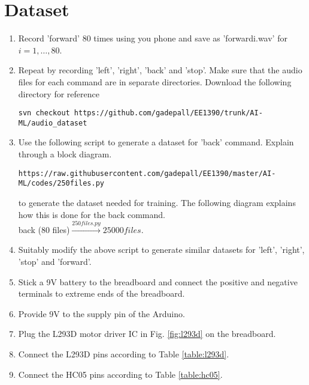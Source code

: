 \documentclass[journal,12pt,twocolumn]{IEEEtran}
\renewcommand\thesection{\arabic{section}}
\begin{document}
\section{Dataset}
%
\begin{enumerate}[label=\thesection.\arabic*
,ref=\thesection.\theenumi]

\item Record 'forward' 80 times using you phone and save as 'forwardi.wav' for $i 
= 1,\dots, 80$.
%
\item Repeat by recording 'left', 'right', 'back' and 'stop'. Make sure that the 
audio files for each command are in separate directories. Download the following 
directory for reference
\begin{lstlisting}
svn checkout https://github.com/gadepall/EE1390/trunk/AI-ML/audio_dataset
\end{lstlisting}
\item Use the following script to generate a dataset for 'back' command. Explain 
through a block diagram.
\begin{lstlisting}
https://raw.githubusercontent.com/gadepall/EE1390/master/AI-ML/codes/250files.py
\end{lstlisting}
%
\solution
to generate the dataset needed for training. The following diagram explains how this 
is done for the back command.
\\
back (80 files)$\overset{250files.py}{\rightarrow}25000 files$.
\item Suitably modify the above script to generate similar datasets for 'left', 'right', 'stop' and 'forward'. 
%
\item 
Stick a 9V battery to the breadboard and connect the positive and negative terminals to extreme ends of the breadboard.
%
\item
Provide 9V to the supply pin of the Arduino.
%
\item
Plug the L293D motor driver IC in Fig. \ref{fig:l293d} on the breadboard.

%
%
\item
Connect the L293D pins according to Table \ref{table:l293d}.

%	
\item
Connect the HC05 pins according to Table \ref{table:hc05}.


%
%	


\end{enumerate}
%
\end{document}
